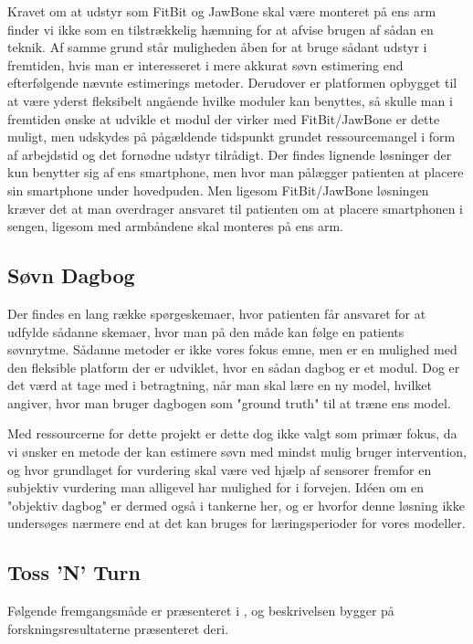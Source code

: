 Kravet om at udstyr som FitBit og JawBone skal være monteret på ens arm finder vi ikke som en tilstrækkelig hæmning for at afvise brugen af sådan en teknik.
Af samme grund står muligheden åben for at bruge sådant udstyr i fremtiden, hvis man er interesseret i mere akkurat søvn estimering end efterfølgende nævnte estimerings metoder.
Derudover er platformen opbygget til at være yderst fleksibelt angående hvilke moduler kan benyttes, så skulle man i fremtiden ønske at udvikle et modul der virker med FitBit/JawBone er dette muligt, men udskydes på pågældende tidspunkt grundet ressourcemangel i form af arbejdstid og det fornødne udstyr tilrådigt.
Der findes lignende løsninger der kun benytter sig af ens smartphone, men hvor man pålægger patienten at placere sin smartphone under hovedpuden.
Men ligesom FitBit/JawBone løsningen kræver det at man overdrager ansvaret til patienten om at placere smartphonen i sengen, ligesom med armbåndene skal monteres på ens arm.

\subsection{Søvn Dagbog}
Der findes en lang række spørgeskemaer, hvor patienten får ansvaret for at udfylde sådanne skemaer, hvor man på den måde kan følge en patients søvnrytme.
Sådanne metoder er ikke vores fokus emne, men er en mulighed med den fleksible platform der er udviklet, hvor en sådan dagbog er et modul.
Dog er det værd at tage med i betragtning, når man skal lære en ny model, hvilket \cite{Min:2014:TNT:2556288.2557220} angiver, hvor man bruger dagbogen som "ground truth" til at træne ens model.

Med ressourcerne for dette projekt er dette dog ikke valgt som primær fokus, da vi ønsker en metode der kan estimere søvn med mindst mulig bruger intervention, og hvor grundlaget for vurdering skal være ved hjælp af sensorer fremfor en subjektiv vurdering man alligevel har mulighed for i forvejen.
Idéen om en "objektiv dagbog" er dermed også i tankerne her, og er hvorfor denne løsning ikke undersøges nærmere end at det kan bruges for læringsperioder for vores modeller.

\subsection{Toss 'N' Turn}\label{sec:tossNturn}
Følgende fremgangsmåde er præsenteret i \citet{Min:2014:TNT:2556288.2557220}, og beskrivelsen bygger på forskningsresultaterne præsenteret deri.

